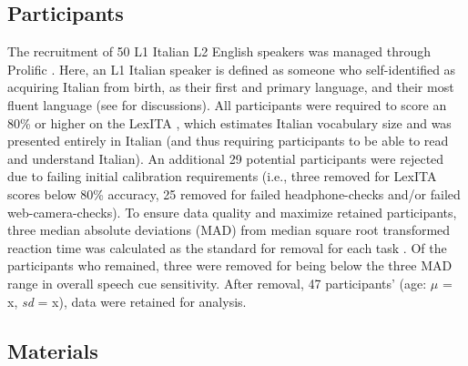 
\subsection{Participants}
The recruitment of 50 L1 Italian L2 English speakers was managed through Prolific \citep{Palan_2018}. Here, an L1 Italian speaker is defined as someone who self-identified as acquiring Italian from birth, as their first and primary language, and their most fluent language (see  \citep{Brown_Tusmagambet_Rahming_Tu_DeSalvo_Wiener_2023} for discussions). All participants were required to score an 80\% or higher on the LexITA \citep{Amenta2021}, which estimates Italian vocabulary size and was presented entirely in Italian (and thus requiring participants to be able to read and understand Italian). An additional 29 potential participants were rejected due to failing initial calibration requirements (i.e., three removed for LexITA scores below 80\% accuracy, 25 removed for failed headphone-checks \citep{milne_2021} and/or failed web-camera-checks). To ensure data quality and maximize retained participants, three median absolute deviations (MAD) from median square root transformed reaction time was calculated as the standard for removal for each task \citep{Leys_2013}. Of the participants who remained, three were removed for being below the three MAD \cite{Leys_2013} range in overall speech cue sensitivity. After removal, 47 participants' (age: $\mu$ = x, \textit{sd} = x), data were retained for analysis. 

\subsection{Materials}

